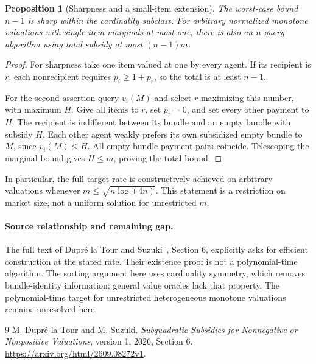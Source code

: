 \documentclass[11pt]{article}
\newtheorem{proposition}{Proposition}
\theoremstyle{definition}
\theoremstyle{remark}
\begin{document}
\begin{proposition}[Sharpness and a small-item extension]
The worst-case bound $n-1$ is sharp within the cardinality subclass. For arbitrary normalized monotone valuations with single-item marginals at most one, there is also an $n$-query algorithm using total subsidy at most $(n-1)m$.
\end{proposition}
\begin{proof}
For sharpness take one item valued at one by every agent. If its recipient is $r$, each nonrecipient requires $p_i\geq1+p_r$, so the total is at least $n-1$.

For the second assertion query $v_i(M)$ and select $r$ maximizing this number, with maximum $H$. Give all items to $r$, set $p_r=0$, and set every other payment to $H$. The recipient is indifferent between its bundle and an empty bundle with subsidy $H$. Each other agent weakly prefers its own subsidized empty bundle to $M$, since $v_i(M)\leq H$. All empty bundle-payment pairs coincide. Telescoping the marginal bound gives $H\leq m$, proving the total bound.
\end{proof}

In particular, the full target rate is constructively achieved on arbitrary valuations whenever $m\leq\sqrt{n\log(4n)}$. This statement is a restriction on market size, not a uniform solution for unrestricted $m$.

\paragraph{Source relationship and remaining gap.}
The full text of Dupr\'e la Tour and Suzuki~\cite{source}, Section 6, explicitly asks for efficient construction at the stated rate. Their existence proof is not a polynomial-time algorithm. The sorting argument here uses cardinality symmetry, which removes bundle-identity information; general value oracles lack that property. The polynomial-time target for unrestricted heterogeneous monotone valuations remains unresolved here.

\begin{thebibliography}{9}
 M. Dupr\'e la Tour and M. Suzuki.
\emph{Subquadratic Subsidies for Nonnegative or Nonpositive Valuations}, version 1, 2026, Section 6.
\url{https://arxiv.org/html/2609.08272v1}.
\end{thebibliography}
\end{document}
